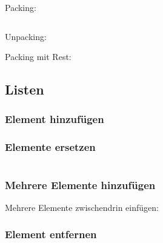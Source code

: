 \begin{minipage}[t]{0.49\textwidth}
	Packing:
	
\end{minipage}
\begin{minipage}[t]{0.02\textwidth} $ \quad $\end{minipage}
\begin{minipage}[t]{0.49\textwidth}
	Unpacking:
	
\end{minipage}
Packing mit Rest:


\subsection{Listen}

\begin{minipage}[t]{0.49\textwidth}
	\subsubsection{Element hinzufügen}
	
	\subsubsection{Elemente ersetzen}
	
\end{minipage}
\begin{minipage}[t]{0.02\textwidth} $ \quad $\end{minipage}
\begin{minipage}[t]{0.49\textwidth}
	\subsubsection{Mehrere Elemente hinzufügen}
	
	Mehrere Elemente zwischendrin einfügen:
	
\end{minipage}


\subsubsection{Element entfernen}



